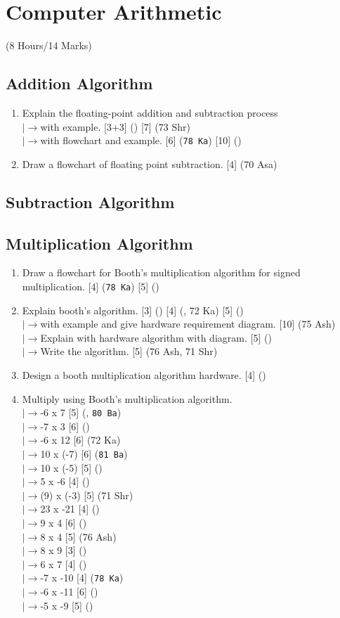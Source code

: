 \documentclass[12pt]{article}
\newcommand{\lb}{\\$\left|\rightarrow\right.$}
\begin{document}
	\pagebreak

\section{Computer Arithmetic}
	\begin{center}(8 Hours/14 Marks)\end{center}
	\subsection{Addition Algorithm}
	\begin{enumerate}[noitemsep, topsep=0pt]
		\item Explain the floating-point addition and subtraction process
		\lb with example. \hfill [3+3] () [7] (73 Shr)
		\lb with flowchart and example. \hfill [6] (\texttt{78 Ka}) [10] ()
		
		\item Draw a flowchart of floating point subtraction. \hfill [4] (70 Asa)
	\end{enumerate}
	\subsection{Subtraction Algorithm}
	\subsection{Multiplication Algorithm}
		\begin{enumerate}[noitemsep, topsep=0pt]
			\item Draw a flowchart for Booth's multiplication algorithm for signed multiplication. \hfill [4] (\texttt{78 Ka}) [5] ()
			
			\item Explain booth's algorithm. \hfill [3] () [4] (, 72 Ka) [5] ()
			\lb with example and give hardware requirement diagram. \hfill [10] (75 Ash)
			\lb Explain with hardware algorithm with diagram. \hfill [5] ()
			\lb Write the algorithm. \hfill [5] (76 Ash, 71 Shr)
			
			\item Design a booth multiplication algorithm hardware. \hfill [4] ()
			
			\item Multiply using Booth's multiplication algorithm.
				\lb -6 x 7 \hfill [5] (, \texttt{80 Ba})
				\lb -7 x 3 \hfill [6] ()
				\lb -6 x 12 \hfill [6] (72 Ka)
				\lb 10 x (-7) \hfill [6] (\texttt{81 Ba})
				\lb 10 x (-5) \hfill [5] ()
				\lb 5 x -6 \hfill [4] ()
				\lb (9) x (-3) \hfill [5] (71 Shr)
				\lb 23 x -21 \hfill [4] ()
				\lb 9 x 4 \hfill [6] ()
				\lb 8 x 4 \hfill [5] (76 Ash)
				\lb 8 x 9 \hfill [3] ()
				\lb 6 x 7 \hfill [4] ()
				\lb -7 x -10 \hfill [4] (\texttt{78 Ka})
				\lb -6 x -11 \hfill [6] ()
				\lb -5 x -9 \hfill [5] ()
		\end{enumerate}
\end{document}
